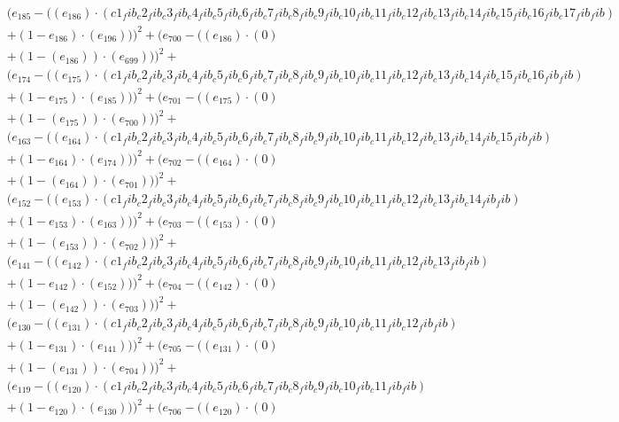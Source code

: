 \documentclass[10pt, a4paper]{article}
\begin{document}
\begin{align*}
& (e_{185} - ((e_{186})  \cdot  (c1_fib_c2_fib_c3_fib_c4_fib_c5_fib_c6_fib_c7_fib_c8_fib_c9_fib_c10_fib_c11_fib_c12_fib_c13_fib_c14_fib_c15_fib_c16_fib_c17_fib_fib) \\
& + (1 - e_{186})  \cdot  (e_{196})))^{2} + (e_{700} - ((e_{186}) \cdot (0) \\
& + (1 - (e_{186})) \cdot (e_{699})))^{2} + \\
& (e_{174} - ((e_{175})  \cdot  (c1_fib_c2_fib_c3_fib_c4_fib_c5_fib_c6_fib_c7_fib_c8_fib_c9_fib_c10_fib_c11_fib_c12_fib_c13_fib_c14_fib_c15_fib_c16_fib_fib) \\
& + (1 - e_{175})  \cdot  (e_{185})))^{2} + (e_{701} - ((e_{175}) \cdot (0) \\
& + (1 - (e_{175})) \cdot (e_{700})))^{2} + \\
& (e_{163} - ((e_{164})  \cdot  (c1_fib_c2_fib_c3_fib_c4_fib_c5_fib_c6_fib_c7_fib_c8_fib_c9_fib_c10_fib_c11_fib_c12_fib_c13_fib_c14_fib_c15_fib_fib) \\
& + (1 - e_{164})  \cdot  (e_{174})))^{2} + (e_{702} - ((e_{164}) \cdot (0) \\
& + (1 - (e_{164})) \cdot (e_{701})))^{2} + \\
& (e_{152} - ((e_{153})  \cdot  (c1_fib_c2_fib_c3_fib_c4_fib_c5_fib_c6_fib_c7_fib_c8_fib_c9_fib_c10_fib_c11_fib_c12_fib_c13_fib_c14_fib_fib) \\
& + (1 - e_{153})  \cdot  (e_{163})))^{2} + (e_{703} - ((e_{153}) \cdot (0) \\
& + (1 - (e_{153})) \cdot (e_{702})))^{2} + \\
& (e_{141} - ((e_{142})  \cdot  (c1_fib_c2_fib_c3_fib_c4_fib_c5_fib_c6_fib_c7_fib_c8_fib_c9_fib_c10_fib_c11_fib_c12_fib_c13_fib_fib) \\
& + (1 - e_{142})  \cdot  (e_{152})))^{2} + (e_{704} - ((e_{142}) \cdot (0) \\
& + (1 - (e_{142})) \cdot (e_{703})))^{2} + \\
& (e_{130} - ((e_{131})  \cdot  (c1_fib_c2_fib_c3_fib_c4_fib_c5_fib_c6_fib_c7_fib_c8_fib_c9_fib_c10_fib_c11_fib_c12_fib_fib) \\
& + (1 - e_{131})  \cdot  (e_{141})))^{2} + (e_{705} - ((e_{131}) \cdot (0) \\
& + (1 - (e_{131})) \cdot (e_{704})))^{2} + \\
& (e_{119} - ((e_{120})  \cdot  (c1_fib_c2_fib_c3_fib_c4_fib_c5_fib_c6_fib_c7_fib_c8_fib_c9_fib_c10_fib_c11_fib_fib) \\
& + (1 - e_{120})  \cdot  (e_{130})))^{2} + (e_{706} - ((e_{120}) \cdot (0) \\

\end{align*}
\end{document}
